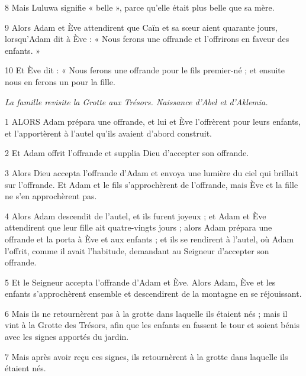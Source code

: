 \par 8 Mais Luluwa signifie « belle », parce qu'elle était plus belle que sa mère.

\par 9 Alors Adam et Ève attendirent que Caïn et sa sœur aient quarante jours, lorsqu'Adam dit à Ève : « Nous ferons une offrande et l'offrirons en faveur des enfants. »

\par 10 Et Ève dit : « Nous ferons une offrande pour le fils premier-né ; et ensuite nous en ferons un pour la fille.


\par \textit{La famille revisite la Grotte aux Trésors. Naissance d'Abel et d'Aklemia.}

\par 1 ALORS Adam prépara une offrande, et lui et Ève l'offrèrent pour leurs enfants, et l'apportèrent à l'autel qu'ils avaient d'abord construit.

\par 2 Et Adam offrit l'offrande et supplia Dieu d'accepter son offrande.

\par 3 Alors Dieu accepta l'offrande d'Adam et envoya une lumière du ciel qui brillait sur l'offrande. Et Adam et le fils s'approchèrent de l'offrande, mais Ève et la fille ne s'en approchèrent pas.

\par 4 Alors Adam descendit de l'autel, et ils furent joyeux ; et Adam et Ève attendirent que leur fille ait quatre-vingts jours ; alors Adam prépara une offrande et la porta à Ève et aux enfants ; et ils se rendirent à l'autel, où Adam l'offrit, comme il avait l'habitude, demandant au Seigneur d'accepter son offrande.

\par 5 Et le Seigneur accepta l'offrande d'Adam et Ève. Alors Adam, Ève et les enfants s'approchèrent ensemble et descendirent de la montagne en se réjouissant.

\par 6 Mais ils ne retournèrent pas à la grotte dans laquelle ils étaient nés ; mais il vint à la Grotte des Trésors, afin que les enfants en fassent le tour et soient bénis avec les signes apportés du jardin.

\par 7 Mais après avoir reçu ces signes, ils retournèrent à la grotte dans laquelle ils étaient nés.

